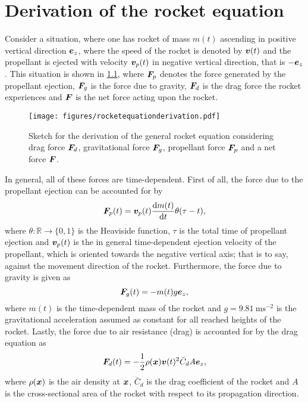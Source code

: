 \documentclass[a4paper,11pt]{report}
\begin{document}
\chapter{Derivation of the rocket equation}
Consider a situation, where one has rocket of mass $m(t)$ ascending in positive vertical direction $\bm{e}_z$, where the speed of the rocket is denoted by $\bm{v}(t)$ and the propellant is ejected with velocity $\bm{v}_p(t)$ in negative vertical direction, that is $-\bm{e}_z$. This situation is shown in \cref{fig:rocketequation}, where $\bm{F}_p$ denotes the force generated by the propellant ejection, $\bm{F}_g$ is the force due to gravity, $\bm{F}_d$ is the drag force the rocket experiences and $\bm{F}$ is the net force acting upon the rocket. 
\begin{figure}[h]
	\centering
	\texttt{[image: figures/rocketequationderivation.pdf]}
	\caption{Sketch for the derivation of the general rocket equation considering drag force $\bm{F}_d$, gravitational force $\bm{F}_g$, propellant force $\bm{F}_p$ and a net force $\bm{F}$.}
	\label{fig:rocketequation}
\end{figure} In general, all of these forces are time-dependent. First of all, the force due to the propellant ejection can be accounted for by \begin{equation}
\bm{F}_p(t) = \bm{v}_p(t)\frac{\mathrm{d}m(t)}{\mathrm{d}t}\theta(\tau-t),
\end{equation} where $\theta: \mathbb{R}\rightarrow \{0,1\}$ is the Heaviside function, $\tau$ is the total time of propellant ejection and $\bm{v}_p(t)$ is the in general time-dependent ejection velocity of the propellant, which is oriented towards the negative vertical axis; that is to say, against the movement direction of the rocket. Furthermore, the force due to gravity is given as \begin{equation}
\bm{F}_g(t) = -m(t)g\bm{e}_z,
\end{equation} where $m(t)$ is the time-dependent mass of the rocket and $g=\SI{9.81}{\meter\second^{-2}}$ is the gravitational acceleration assumed as constant for all reached heights of the rocket. Lastly, the force due to air resistance (drag) is accounted for by the drag equation as \begin{equation}
\bm{F}_d(t) = -\frac{1}{2}\rho(\bm{x})\bm{v}(t)^2 \bar{C}_d A \bm{e}_z,
\end{equation} where $\rho(\bm{x})$ is the air density at $\bm{x}$, $\bar{C}_d$ is the drag coefficient of the rocket and $A$ is the cross-sectional area of the rocket with respect to its propagation direction.
\end{document}
